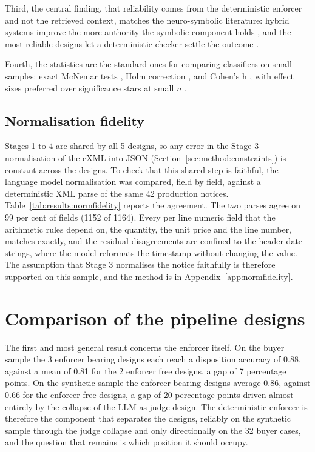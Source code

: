 Third, the central finding, that reliability comes from the deterministic enforcer and not the retrieved context, matches the neuro-symbolic literature: hybrid systems improve the more authority the symbolic component holds \citep{gorenshtein2026neurosymbolic}, and the most reliable designs let a deterministic checker settle the outcome \citep{yang2025neurosymbolic}.

Fourth, the statistics are the standard ones for comparing classifiers on small samples: exact McNemar tests \citep{dietterich1998approximate}, Holm correction \citep{holm1979simple}, and Cohen's h \citep{cohen1988statistical}, with effect sizes preferred over significance stars at small $n$ \citep{berrar2017confidence}.


\subsection{Normalisation fidelity}
\label{sec:results:normfidelity}

Stages 1 to 4 are shared by all 5 designs, so any error in the Stage 3 normalisation of the cXML into JSON (Section~\ref{sec:method:constraints}) is constant across the designs. To check that this shared step is faithful, the language model normalisation was compared, field by field, against a deterministic XML parse of the same 42 production notices. Table~\ref{tab:results:normfidelity} reports the agreement. The two parses agree on 99 per cent of fields (1152 of 1164). Every per line numeric field that the arithmetic rules depend on, the quantity, the unit price and the line number, matches exactly, and the residual disagreements are confined to the header date strings, where the model reformats the timestamp without changing the value. The assumption that Stage 3 normalises the notice faithfully is therefore supported on this sample, and the method is in Appendix~\ref{app:normfidelity}.

\section{Comparison of the pipeline designs}
\label{sec:results:comparison}

The first and most general result concerns the enforcer itself. On the buyer sample the 3 enforcer bearing designs each reach a disposition accuracy of 0.88, against a mean of 0.81 for the 2 enforcer free designs, a gap of 7 percentage points. On the synthetic sample the enforcer bearing designs average 0.86, against 0.66 for the enforcer free designs, a gap of 20 percentage points driven almost entirely by the collapse of the LLM-as-judge design. The deterministic enforcer is therefore the component that separates the designs, reliably on the synthetic sample through the judge collapse and only directionally on the 32 buyer cases, and the question that remains is which position it should occupy.


